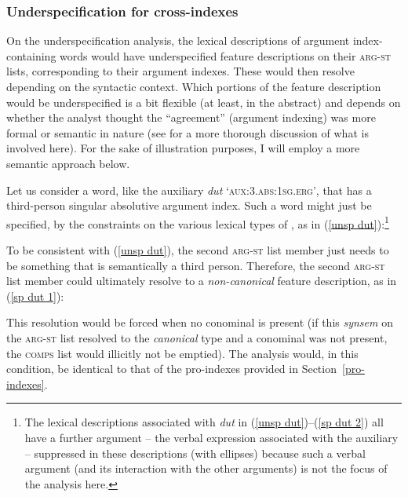 \documentclass[output=paper,biblatex,babelshorthands,newtxmath,draftmode,colorlinks,citecolor=brown]{langscibook}
\begin{document}
\subsubsection{Underspecification for cross-indexes}

On the underspecification analysis, the lexical descriptions of argument index-containing words would have underspecified feature descriptions on their \textsc{arg-st} lists, corresponding to their argument indexes. These would then resolve depending on the syntactic context. Which portions of the feature description would be underspecified is a bit flexible (at least, in the abstract) and depends on whether the analyst thought the ``agreement'' (argument indexing) was more formal or semantic in nature (see  for a more thorough discussion of what is involved here). For the sake of illustration purposes, I will employ a more semantic approach below.

Let us consider a word, like the  auxiliary \textit{dut} `\textsc{aux:3.abs:1sg.erg}', that has a third-person singular absolutive argument index. Such a word might just be specified, by the constraints on the various lexical types of , as in (\ref{unsp dut}):\footnote{The lexical descriptions associated with \textit{dut} in (\ref{unsp dut})--(\ref{sp dut 2}) all have a further argument -- the verbal expression associated with the auxiliary -- suppressed in these descriptions (with ellipses) because such a verbal argument (and its interaction with the other arguments) is not the focus of the analysis here.}
%
\begin{exe}
\ex\label{unsp dut}
\end{exe}
%
To be consistent with (\ref{unsp dut}), the second \textsc{arg-st} list member just needs to be something that is semantically a third person. Therefore, the second \textsc{arg-st} list member could ultimately resolve to a \textit{non-canonical} feature description, as in (\ref{sp dut 1}): 
%
\begin{exe}
\ex\label{sp dut 1}
\end{exe}
%
This resolution would be forced when no conominal is present (if this \textit{synsem} on the \textsc{arg-st} list resolved to the \textit{canonical} type and a conominal was not present, the \textsc{comps} list would illicitly not be emptied). The analysis would, in this condition, be identical to that of the pro-indexes provided in Section~\ref{pro-indexes}.
\end{document}
